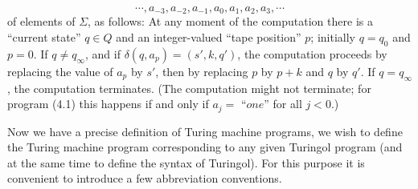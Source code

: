 \documentclass[a4paper]{article}
\begin{document}
\begin{equation}
	\cdots, a_{-3}, a_{-2}, a_{-1}, a_0, a_1, a_2, a_3, \cdots
\end{equation}
of elements of $\Sigma$, as follows: At any moment of the computation there is a
``current state'' $q \in Q$ and an integer-valued ``tape position'' $p$;
initially $q=q_0$ and $p=0$. If $q \neq q_\infty$, and if $\delta(q,
a_p)=(s',k,q')$, the computation proceeds by replacing the value of $a_p$ by
$s'$, then by replacing $p$ by $p+k$ and $q$ by $q'$. If $q=q_\infty$, the
computation terminates. (The computation might not terminate; for program (4.1)
this happens if and only if $a_j =$ ``$one$'' for all $j<0$.)

Now we have a precise definition of Turing machine programs, we wish to define
the Turing machine program corresponding to any given Turingol program (and at
the same time to define the syntax of Turingol). For this purpose it is
convenient to introduce a few abbreviation conventions.
\end{document}
